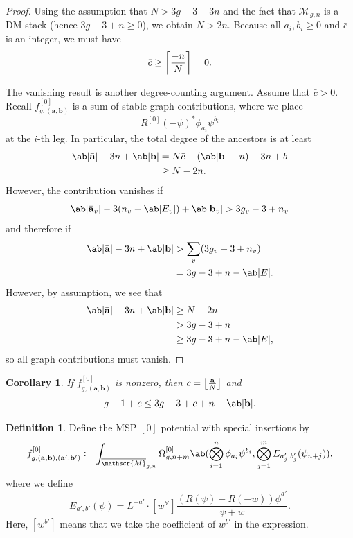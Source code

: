 \documentclass[10pt]{amsart}
\DeclarePairedDelimiter{\floor}{\lfloor}{\rfloor}
\DeclarePairedDelimiter{\ceil}{\lceil}{\rceil}
\newtheorem{cor}[thm]{Corollary}
\theoremstyle{definition}
\newtheorem{defn}[thm]{Definition}
\theoremstyle{remark}
\theoremstyle{plain}
\theoremstyle{definition}
\theoremstyle{remark}
\newcommand{\ba}{\mathbf{a}}
\newcommand{\bb}{\mathbf{b}}
\newcommand{\msc}[1]{\mathscr{#1}}
\newcommand{\ol}[1]{\overline{#1}}
\newcommand{\1}{\mathbf{1}}
\newcommand{\2}{\mathbf{2}}
\newcommand{\3}{\mathbf{3}}
\numberwithin{equation}{section}
\begin{document}
\begin{proof}
    Using the assumption that $N > 3g-3+3n$ and the fact that $\ol{\msc{M}}_{g,n}$ is a DM stack (hence $3g-3+n \geq 0$), we obtain $N > 2n$. Because all $a_i,b_i \geq 0$ and $\bar{c}$ is an integer, we must have
    \[ \bar{c} \geq \ceil*{\frac{-n}{N}} = 0. \]

    The vanishing result is another degree-counting argument. Assume that $\bar{c} > 0$. Recall $f_{g,(\ba,\bb)}^{[0]}$ is a sum of stable graph contributions, where we place
    \[ R^{[0]}(-\psi)^* \phi_{a_i} \psi^{b_i} \]
    at the $i$-th leg. In particular, the total degree of the ancestors is at least
    \begin{align*}
        \ab|\bar{\ba}| - 3n + \ab|\bb| &= N\bar{c} - (\ab|\bb| - n) - 3n + b \\
        &\geq N - 2n.
    \end{align*}
    However, the contribution vanishes if
    \[ \ab|\bar{\ba}_v| - 3(n_v - \ab|E_v|) + \ab|\bb_v| > 3g_v - 3 + n_v \]
    and therefore if
    \begin{align*}
        \ab|\bar{\ba}| - 3n + \ab|\bb| &> \sum_v (3g_v - 3 + n_v) \\
        &= 3g - 3 + n - \ab|E|. 
    \end{align*}
    However, by assumption, we see that
    \begin{align*}
        \ab|\bar{\ba}| - 3n + \ab|\bb| &\geq N - 2n \\
        &> 3g-3+n \\
        &\geq 3g-3+n-\ab|E|,
    \end{align*}
    so all graph contributions must vanish.
\end{proof}

\begin{cor}\label{cor:criterionforc}
    If $f_{g,(\ba,\bb)}^{[0]}$ is nonzero, then $c = \floor*{\frac{\ba}{N}}$ and
    \[ g-1+c \leq 3g-3+c+n-\ab|\bb|. \]
\end{cor}

\begin{defn}\label{defn:0potspecial}
    Define the MSP $[0]$ potential with special insertions by
    \[ f_{g,(\ba,\bb),(\ba',\bb')}^{[0]} \coloneqq \int_{\ol{\msc{M}}_{g,n}} \Omega_{g,n+m}^{[0]}\ab(\bigotimes_{i=1}^n \phi_{a_i} \psi^{b_i}, \bigotimes_{j=1}^m E_{a'_j, b'_j}(\psi_{n+j})), \]
    where we define
    \[ E_{a',b'}(\psi) = L^{-a'} \cdot [w^{b'}] \frac{( R(\psi) - R(-w) )\bar{\phi}^{a'}}{\psi+w}. \]
    Here, $[w^{b'}]$ means that we take the coefficient of $w^{b'}$ in the expression.
\end{defn}
\end{document}

